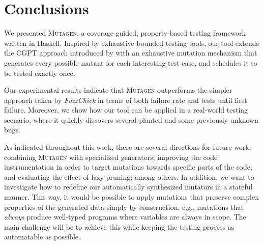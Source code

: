 \documentclass[sigconf, anonymous, review]{acmart}
\newcommand{\fuzzchick}{\textit{FuzzChick}\xspace}
\newcommand{\mutagen}{\textsc{Mutagen}\xspace}
\begin{document}

\section{Conclusions}
\label{sec:conclusions}

We presented \mutagen, a coverage-guided, property-based testing framework
written in Haskell.
%
Inspired by exhaustive bounded testing tools, our tool extends the CGPT approach
introduced by \citeauthor{lampropoulos2019coverage} with an exhaustive mutation
mechanism that generates every possible mutant for each interesting test case,
and schedules it to be tested exactly once.




Our experimental results indicate that \mutagen outperforms the simpler approach
taken by \fuzzchick in terms of both failure rate and tests until first failure.
%
Moreover, we show how our tool can be applied in a real-world testing scenario,
where it quickly discovers several planted and some previously unknown bugs.


As indicated throughout this work, there are several directions for future work:
%
combining \mutagen with specialized generators; improving the code
instrumentation in order to target mutations towards specific parts of the code;
and evaluating the effect of lazy pruning; among others.
%
In addition, we want to investigate how to redefine our automatically
synthesized mutators in a stateful manner.
%
This way, it would be possible to apply mutations that preserve complex
properties of the generated data simply by construction, e.g., mutations that
\emph{always} produce well-typed programs where variables are always in scope.
%
The main challenge will be to achieve this while keeping the testing process as
automatable as possible.
\end{document}
